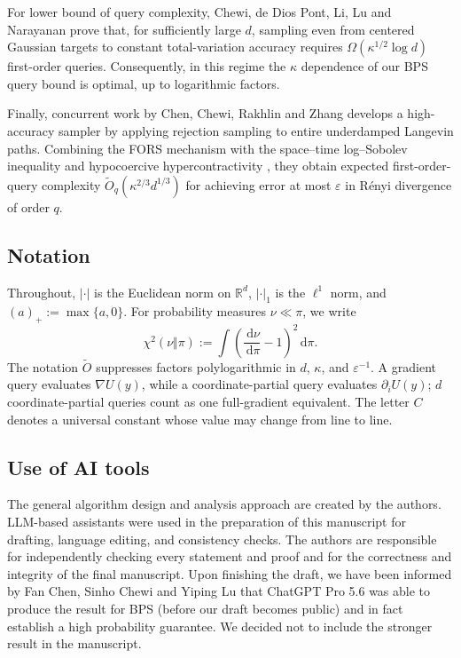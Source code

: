 \documentclass{amsart}
\theoremstyle{plain}
\theoremstyle{definition}
\theoremstyle{remark}
\newcommand{\ud}{\,\mathrm{d}}
\newcommand{\RR}{\mathbb{R}}
\newcommand{\abs}[1]{\lvert#1\rvert}
\newcommand{\R}{\RR}
\newcommand{\1}{\mathbf 1}
\newcommand{\dd}{\ud}
\begin{document}
For lower bound of query complexity, Chewi, de Dios Pont, Li, Lu and Narayanan \cite{ChewiEtAlQueryLB} prove that,
for sufficiently large $d$, sampling even from
centered Gaussian targets to constant total-variation accuracy requires
$\Omega(\kappa^{1/2}\log d)$ first-order queries.  Consequently, in
this regime the $\kappa$ dependence of our BPS query bound is optimal, up to logarithmic factors.

Finally, concurrent work by Chen, Chewi, Rakhlin and Zhang
\cite{ChenChewi} develops a high-accuracy sampler by applying rejection
sampling to entire underdamped Langevin paths.
Combining the FORS mechanism \cite{ChenChewiDaskalakisRakhlin2026,ChenChewiDaskalakisRakhlinStochastic2026} with the space--time log--Sobolev inequality and hypocoercive
hypercontractivity \cite{LuUnderdampedEntropy, LiLuHypercontractivity}, they obtain expected
first-order-query complexity $\widetilde O_q(\kappa^{2/3}d^{1/3})$ for
achieving error at most $\varepsilon$ in R\'enyi divergence of order $q$.





\subsection*{Notation}

Throughout, $\abs{\cdot}$ is the Euclidean norm on $\R^d$,
$\abs{\cdot}_1$ is the $\ell^1$ norm, and $(a)_+:=\max\{a,0\}$.
For probability measures $\nu\ll\pi$, we write
\[
        \chi^2(\nu\Vert\pi)
        :=\int\left(\frac{\dd\nu}{\dd\pi}-1\right)^2\dd\pi .
\]
The notation $\widetilde O$ suppresses factors polylogarithmic in
$d$, $\kappa$, and $\varepsilon^{-1}$.  A gradient query evaluates
$\nabla U(y)$, while a coordinate-partial query evaluates
$\partial_iU(y)$; $d$ coordinate-partial queries count as one full-gradient
equivalent.  The letter $C$ denotes a universal constant whose
value may change from line to line.

\subsection*{Use of AI tools} The general algorithm design and analysis approach are created by the authors. LLM-based assistants were used in the preparation of this manuscript for drafting, language editing, and consistency checks.  The authors are responsible for independently checking every statement and proof and for the correctness and integrity of the final manuscript. Upon finishing the draft, we have been informed by Fan Chen, Sinho Chewi and Yiping Lu that ChatGPT Pro 5.6 was able to produce the result for BPS (before our draft becomes public) and in fact establish a high probability guarantee. We decided not to include the stronger result in the manuscript. 
\end{document}
